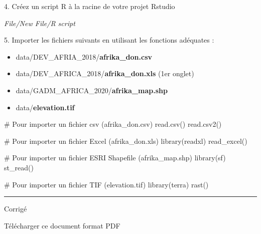 \documentclass[
  letterpaper,
  DIV=11,
  numbers=noendperiod]{scrartcl}
\newenvironment{Shaded}{\begin{snugshade}}{\end{snugshade}}
\newcommand{\CommentTok}[1]{\textcolor[rgb]{0.37,0.37,0.37}{#1}}
\newcommand{\FunctionTok}[1]{\textcolor[rgb]{0.28,0.35,0.67}{#1}}
\newcommand{\NormalTok}[1]{\textcolor[rgb]{0.00,0.23,0.31}{#1}}
\providecommand{\tightlist}{%
  \setlength{\itemsep}{0pt}\setlength{\parskip}{0pt}}\usepackage{longtable,booktabs,array}
\begin{document}
{4. Créez un script R à la racine de votre projet Rstudio}

\emph{File/New File/R script}

{5. Importer les fichiers suivants en utilisant les fonctions adéquates
:}

\begin{itemize}
\tightlist
\item
  data/DEV\_AFRIA\_2018/\textbf{afrika\_don.csv}\\
\item
  data/DEV\_AFRICA\_2018/\textbf{afrika\_don.xls} (1er onglet)\\
\item
  data/GADM\_AFRICA\_2020/\textbf{afrika\_map.shp}\\
\item
  data/\textbf{elevation.tif}
\end{itemize}

\begin{Shaded}
\begin{Highlighting}[]
\CommentTok{\# Pour importer un fichier csv (afrika\_don.csv)}
\FunctionTok{read.csv}\NormalTok{()}
\FunctionTok{read.csv2}\NormalTok{()}

\CommentTok{\# Pour importer un fichier Excel (afrika\_don.xls)}
\FunctionTok{library}\NormalTok{(readxl)}
\FunctionTok{read\_excel}\NormalTok{()}

\CommentTok{\# Pour importer un fichier ESRI Shapefile (afrika\_map.shp)}
\FunctionTok{library}\NormalTok{(sf)}
\FunctionTok{st\_read}\NormalTok{()}

\CommentTok{\# Pour importer un fichier TIF (elevation.tif)}
\FunctionTok{library}\NormalTok{(terra)}
\FunctionTok{rast}\NormalTok{()}
\end{Highlighting}
\end{Shaded}

\begin{center}\rule{0.5\linewidth}{0.5pt}\end{center}

\hfill\break

Corrigé

\hfill\break
\hfill\break

Télécharger ce document format PDF
\end{document}
